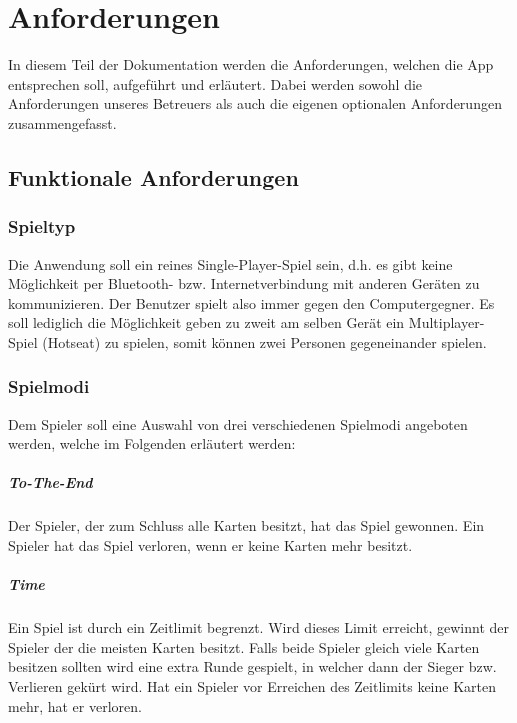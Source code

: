 \chapter{Anforderungen}
\label{cha:anforderungen}

In diesem Teil der Dokumentation werden die Anforderungen, welchen die App entsprechen soll, aufgeführt und erläutert. Dabei werden sowohl die Anforderungen unseres Betreuers als auch die eigenen optionalen Anforderungen zusammengefasst.

\section{Funktionale Anforderungen}
\label{sec:funtionaleanforderungen}

\subsection{Spieltyp}
Die Anwendung soll ein reines Single-Player-Spiel sein, d.h. es gibt keine Möglichkeit per Bluetooth- bzw. Internetverbindung mit anderen Geräten zu kommunizieren. Der Benutzer spielt also immer gegen den Computergegner. Es soll lediglich die Möglichkeit geben zu zweit am selben Gerät ein Multiplayer-Spiel (Hotseat) zu spielen, somit können zwei Personen gegeneinander spielen.

\subsection{Spielmodi}
Dem Spieler soll eine Auswahl von drei verschiedenen Spielmodi angeboten werden, welche im Folgenden erläutert werden:
\paragraph{To-The-End}
Der Spieler, der zum Schluss alle Karten besitzt, hat das Spiel gewonnen. Ein Spieler hat das Spiel verloren, wenn er keine Karten mehr besitzt.
\paragraph{Time}
Ein Spiel ist durch ein Zeitlimit begrenzt. Wird dieses Limit erreicht, gewinnt der Spieler der die meisten Karten besitzt. Falls beide Spieler gleich viele Karten besitzen sollten wird eine extra Runde gespielt, in welcher dann der Sieger bzw. Verlieren gekürt wird. Hat ein Spieler vor Erreichen des Zeitlimits keine Karten mehr, hat er verloren.
